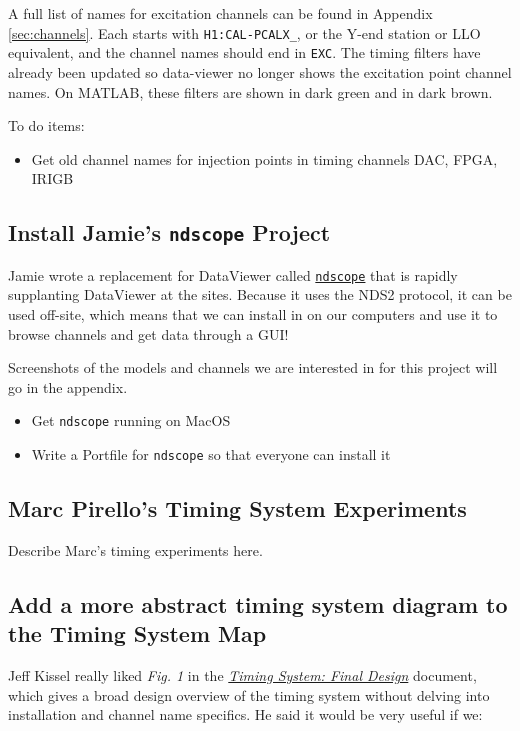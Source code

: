 \documentclass{article}
\newcommand*{\TODO}{\textcolor{todo}}
\begin{document}
A full list of names for excitation channels can be found in Appendix \ref{sec:channels}. Each starts with \texttt{H1:CAL-PCALX\_}, or the Y-end station or LLO equivalent, and the channel names should end in \texttt{EXC}. The timing filters have already been updated so data-viewer no longer shows the excitation point channel names. On MATLAB, these filters are shown in dark green and in dark brown.

To do items:
\begin{itemize}
    \item \TODO{Get old channel names for injection points in timing channels DAC, FPGA, IRIGB}
\end{itemize}

\subsection{Install Jamie's \texttt{ndscope} Project}

Jamie wrote a replacement for DataViewer called \href{https://git.ligo.org/cds/ndscope}{\texttt{ndscope}} that is rapidly supplanting DataViewer at the sites. Because it uses the NDS2 protocol, it can be used off-site, which means that we can install in on our computers and use it to browse channels and get data through a GUI!

\TODO{Screenshots of the models and channels we are interested in for this project will go in the appendix.}

\begin{itemize}
    \item \TODO{Get \texttt{ndscope} running on MacOS}
    \item \TODO{Write a Portfile for \texttt{ndscope} so that everyone can install it}
\end{itemize}

\subsection{\label{sec:marc-pirello}Marc Pirello's Timing System Experiments}

\TODO{Describe Marc's timing experiments here.}

\subsection{Add a more abstract timing system diagram to the Timing System Map}

Jeff Kissel really liked \textit{Fig. 1} in the \textit{\href{https://dcc.ligo.org/LIGO-T070173}{Timing System: Final Design}} document, which gives a broad design overview of the timing system without delving into installation and channel name specifics. He said it would be very useful if we:
\end{document}
